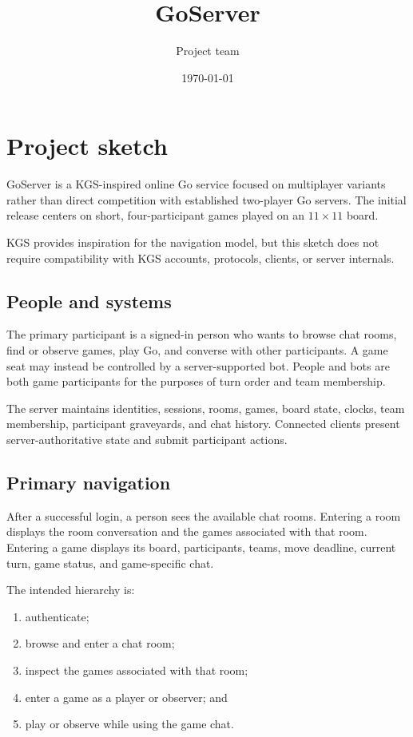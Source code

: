 \documentclass[11pt,oneside]{book}
\title{GoServer}
\author{Project team}
\date{\today}
\begin{document}
\frontmatter
\maketitle
\tableofcontents
\mainmatter

\chapter{Project sketch}
GoServer is a KGS-inspired online Go service focused on multiplayer variants rather than direct competition with established two-player Go servers. The initial release centers on short, four-participant games played on an \(11\times 11\) board.

KGS provides inspiration for the navigation model, but this sketch does not require compatibility with KGS accounts, protocols, clients, or server internals.

\section{People and systems}
The primary participant is a signed-in person who wants to browse chat rooms, find or observe games, play Go, and converse with other participants. A game seat may instead be controlled by a server-supported bot. People and bots are both game participants for the purposes of turn order and team membership.

The server maintains identities, sessions, rooms, games, board state, clocks, team membership, participant graveyards, and chat history. Connected clients present server-authoritative state and submit participant actions.

\section{Primary navigation}
After a successful login, a person sees the available chat rooms. Entering a room displays the room conversation and the games associated with that room. Entering a game displays its board, participants, teams, move deadline, current turn, game status, and game-specific chat.

The intended hierarchy is:
\begin{enumerate}
  \item authenticate;
  \item browse and enter a chat room;
  \item inspect the games associated with that room;
  \item enter a game as a player or observer; and
  \item play or observe while using the game chat.
\end{enumerate}
\end{document}
